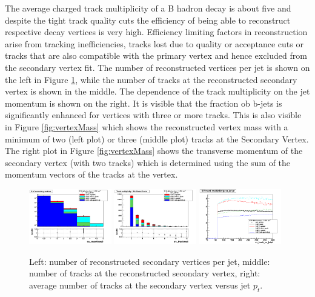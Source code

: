 The average charged track multiplicity of a B hadron decay is about five and despite the tight
track quality cuts the efficiency of being able to reconstruct respective decay vertices is very
high. Efficiency limiting factors in reconstruction arise from tracking inefficiencies, tracks lost
due to quality or acceptance cuts or tracks that are also compatible with the primary vertex and
hence excluded from the secondary vertex fit. The number of reconstructed vertices per jet is shown on the left in Figure \ref{fig:vertexNtracks}, while  the number of tracks at the reconstructed secondary vertex is shown in the middle. The dependence of the track multiplicity on the jet momentum is shown on the right. It is visible that the fraction ob b-jets is significantly enhanced for vertices with three or more tracks. This is also visible in  Figure \ref{fig:vertexMass} which shows the reconstructed vertex mass with a minimum of two (left plot) or three (middle plot) tracks at the Secondary Vertex. The right plot in Figure \ref{fig:vertexMass} shows the transverse momentum of the secondary vertex (with two tracks) which is determined using the sum of the momentum vectors of the  tracks at the vertex.

\begin{figure}[h!]
\centering
\includegraphics[width=0.32\textwidth]{figures/sv_nvertices0_Log.png}
\includegraphics[width=0.32\textwidth]{figures/sv_trackmul_Linear.png}
\includegraphics[width=0.32\textwidth]{figures/sv_track_vs_jetpt_Linear.png}
\caption{Left: number of reconstructed secondary vertices per jet, middle: number of tracks at the reconstructed secondary vertex, right: average number of tracks at the secondary vertex versus jet $p_t$. }
\label{fig:vertexNtracks}
\end{figure}

